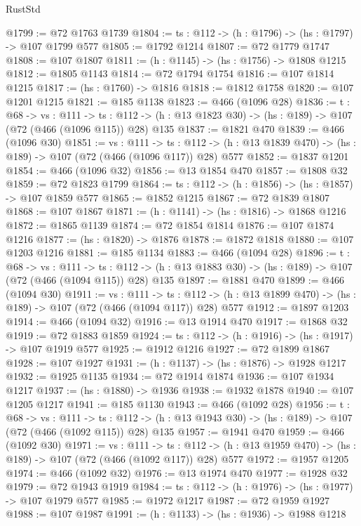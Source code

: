 \begin{lexlean}{RustStd}
\begin{coremodule}
{\begin{coremodule}
{{{{@1799 := @72 @1763 @1739
@1804 := {ts : @112} -> (h : @1796) -> (hs : @1797) -> @107 @1799 @577
@1805 := @1792 @1214
@1807 := @72 @1779 @1747
@1808 := @107 @1807
@1811 := (h : @1145) -> (hs : @1756) -> @1808 @1215
@1812 := @1805 @1143
@1814 := @72 @1794 @1754
@1816 := @107 @1814 @1215
@1817 := (hs : @1760) -> @1816
@1818 := @1812 @1758
@1820 := @107 @1201 @1215
@1821 := @185 @1138
@1823 := @466 (@1096 @28)
@1836 := {t : @68} ->
  {vs : @111} ->
  {ts : @112} -> (h : @13 @1823 @30) -> (hs : @189) -> @107 (@72 (@466 (@1096 @115)) @28) @135
@1837 := @1821 @470
@1839 := @466 (@1096 @30)
@1851 := {vs : @111} ->
  {ts : @112} -> (h : @13 @1839 @470) -> (hs : @189) -> @107 (@72 (@466 (@1096 @117)) @28) @577
@1852 := @1837 @1201
@1854 := @466 (@1096 @32)
@1856 := @13 @1854 @470
@1857 := @1808 @32
@1859 := @72 @1823 @1799
@1864 := {ts : @112} -> (h : @1856) -> (hs : @1857) -> @107 @1859 @577
@1865 := @1852 @1215
@1867 := @72 @1839 @1807
@1868 := @107 @1867
@1871 := (h : @1141) -> (hs : @1816) -> @1868 @1216
@1872 := @1865 @1139
@1874 := @72 @1854 @1814
@1876 := @107 @1874 @1216
@1877 := (hs : @1820) -> @1876
@1878 := @1872 @1818
@1880 := @107 @1203 @1216
@1881 := @185 @1134
@1883 := @466 (@1094 @28)
@1896 := {t : @68} ->
  {vs : @111} ->
  {ts : @112} -> (h : @13 @1883 @30) -> (hs : @189) -> @107 (@72 (@466 (@1094 @115)) @28) @135
@1897 := @1881 @470
@1899 := @466 (@1094 @30)
@1911 := {vs : @111} ->
  {ts : @112} -> (h : @13 @1899 @470) -> (hs : @189) -> @107 (@72 (@466 (@1094 @117)) @28) @577
@1912 := @1897 @1203
@1914 := @466 (@1094 @32)
@1916 := @13 @1914 @470
@1917 := @1868 @32
@1919 := @72 @1883 @1859
@1924 := {ts : @112} -> (h : @1916) -> (hs : @1917) -> @107 @1919 @577
@1925 := @1912 @1216
@1927 := @72 @1899 @1867
@1928 := @107 @1927
@1931 := (h : @1137) -> (hs : @1876) -> @1928 @1217
@1932 := @1925 @1135
@1934 := @72 @1914 @1874
@1936 := @107 @1934 @1217
@1937 := (hs : @1880) -> @1936
@1938 := @1932 @1878
@1940 := @107 @1205 @1217
@1941 := @185 @1130
@1943 := @466 (@1092 @28)
@1956 := {t : @68} ->
  {vs : @111} ->
  {ts : @112} -> (h : @13 @1943 @30) -> (hs : @189) -> @107 (@72 (@466 (@1092 @115)) @28) @135
@1957 := @1941 @470
@1959 := @466 (@1092 @30)
@1971 := {vs : @111} ->
  {ts : @112} -> (h : @13 @1959 @470) -> (hs : @189) -> @107 (@72 (@466 (@1092 @117)) @28) @577
@1972 := @1957 @1205
@1974 := @466 (@1092 @32)
@1976 := @13 @1974 @470
@1977 := @1928 @32
@1979 := @72 @1943 @1919
@1984 := {ts : @112} -> (h : @1976) -> (hs : @1977) -> @107 @1979 @577
@1985 := @1972 @1217
@1987 := @72 @1959 @1927
@1988 := @107 @1987
@1991 := (h : @1133) -> (hs : @1936) -> @1988 @1218
}}}}
\end{coremodule}}
\end{coremodule}
\end{lexlean}
